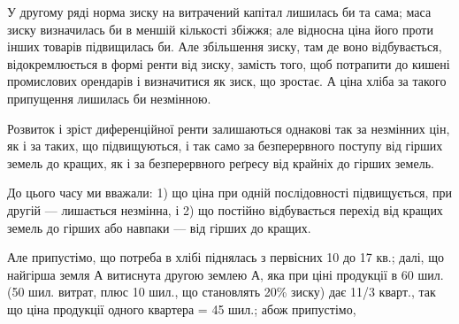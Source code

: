 У другому ряді норма зиску на витрачений капітал лишилась би та
сама; маса зиску визначилась би в меншій кількості збіжжя; але відносна ціна
його проти інших товарів підвищилась би. Але збільшення зиску, там де воно
відбувається, відокремлюється в формі ренти від зиску, замість того, щоб потрапити
до кишені промислових орендарів і визначитися як зиск, що зростає.
А ціна хліба за такого припущення лишилась би незмінною.

Розвиток і зріст диференційної ренти залишаються однакові так за незмінних
цін, як і за таких, що підвищуються, і так само за безперервного поступу
від гірших земель до кращих, як і за безперервного реґресу від крайніх
до гірших земель.

До цього часу ми вважали: 1) що ціна при одній послідовності підвищується,
при другій — лишається незмінна, і 2) що постійно відбувається перехід
від кращих земель до гірших або навпаки — від гірших до кращих.

Але припустімо, що потреба в хлібі піднялась з первісних 10 до 17 кв.;
далі, що найгірша земля А витиснута другою землею А, яка при ціні продукції
в 60 шил. (50 шил. витрат, плюс 10 шил., що становлять 20\% зиску) дає
11/3 кварт., так що ціна продукції одного квартера = 45 шил.; абож припустімо,
